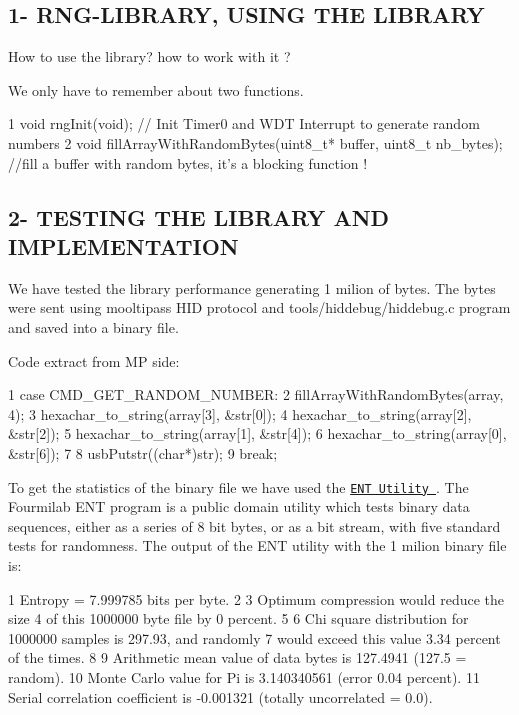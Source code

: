 \subsection*{1-\/ R\+N\+G-\/\+L\+I\+B\+R\+A\+RY, U\+S\+I\+NG T\+HE L\+I\+B\+R\+A\+RY }

How to use the library? how to work with it ?

We only have to remember about two functions.


\begin{DoxyCode}
1 void rngInit(void); // Init Timer0 and WDT Interrupt to generate random numbers
2 void fillArrayWithRandomBytes(uint8\_t* buffer, uint8\_t nb\_bytes); //fill a buffer with random bytes, it's a
       blocking function !
\end{DoxyCode}


\subsection*{2-\/ T\+E\+S\+T\+I\+NG T\+HE L\+I\+B\+R\+A\+RY A\+ND I\+M\+P\+L\+E\+M\+E\+N\+T\+A\+T\+I\+ON }

We have tested the library performance generating 1 milion of bytes. The bytes were sent using mooltipass H\+ID protocol and tools/hiddebug/hiddebug.\+c program and saved into a binary file.

Code extract from MP side\+: 
\begin{DoxyCode}
1 case CMD\_GET\_RANDOM\_NUMBER:
2     fillArrayWithRandomBytes(array, 4);
3     hexachar\_to\_string(array[3], &str[0]);
4     hexachar\_to\_string(array[2], &str[2]);
5     hexachar\_to\_string(array[1], &str[4]);
6     hexachar\_to\_string(array[0], &str[6]);
7 
8     usbPutstr((char*)str);
9     break;
\end{DoxyCode}


To get the statistics of the binary file we have used the \href{http://www.fourmilab.ch/random/}{\tt E\+NT Utility }. The Fourmilab E\+NT program is a public domain utility which tests binary data sequences, either as a series of 8 bit bytes, or as a bit stream, with five standard tests for randomness. The output of the E\+NT utility with the 1 milion binary file is\+:


\begin{DoxyCode}
1 Entropy = 7.999785 bits per byte.
2 
3 Optimum compression would reduce the size
4 of this 1000000 byte file by 0 percent.
5 
6 Chi square distribution for 1000000 samples is 297.93, and randomly
7 would exceed this value 3.34 percent of the times.
8 
9 Arithmetic mean value of data bytes is 127.4941 (127.5 = random).
10 Monte Carlo value for Pi is 3.140340561 (error 0.04 percent).
11 Serial correlation coefficient is -0.001321 (totally uncorrelated = 0.0).
\end{DoxyCode}


